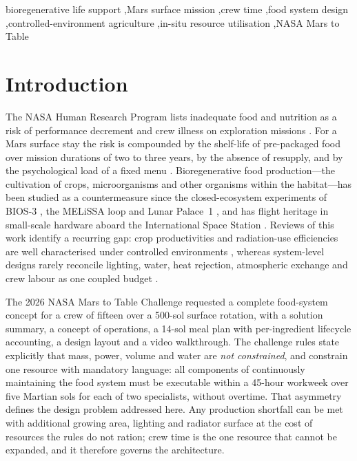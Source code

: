 \documentclass[11pt,a4paper,3p,authoryear]{elsarticle}
\begin{document}
\begin{frontmatter}
\begin{keyword}
bioregenerative life support \sep Mars surface mission \sep crew time \sep food system design \sep controlled-environment agriculture \sep in-situ resource utilisation \sep NASA Mars to Table
\end{keyword}

\end{frontmatter}

\section{Introduction}\label{sec:intro}

The NASA Human Research Program lists inadequate food and nutrition as a risk of performance decrement and crew illness on exploration missions \citep{NASAhrr2026}. For a Mars surface stay the risk is compounded by the shelf-life of pre-packaged food over mission durations of two to three years, by the absence of resupply, and by the psychological load of a fixed menu \citep{Douglas2020spacefood,Smith2021nutrition}. Bioregenerative food production---the cultivation of crops, microorganisms and other organisms within the habitat---has been studied as a countermeasure since the closed-ecosystem experiments of BIOS-3 \citep{Gitelson1989bios3}, the MELiSSA loop \citep{Lasseur2010melissa} and Lunar Palace~1 \citep{Fu2016lunarpalace}, and has flight heritage in small-scale hardware aboard the International Space Station \citep{Massa2017veggie}. Reviews of this work identify a recurring gap: crop productivities and radiation-use efficiencies are well characterised under controlled environments \citep{Wheeler2008productivity,Wheeler2017agriculture}, whereas system-level designs rarely reconcile lighting, water, heat rejection, atmospheric exchange and crew labour as one coupled budget \citep{Monje2003farming}.

The 2026 NASA Mars to Table Challenge \citep{NASAm2t2026} requested a complete food-system concept for a crew of fifteen over a 500-sol surface rotation, with a solution summary, a concept of operations, a 14-sol meal plan with per-ingredient lifecycle accounting, a design layout and a video walkthrough. The challenge rules state explicitly that mass, power, volume and water are \emph{not constrained}, and constrain one resource with mandatory language: all components of continuously maintaining the food system must be executable within a 45-hour workweek over five Martian sols for each of two specialists, without overtime. That asymmetry defines the design problem addressed here. Any production shortfall can be met with additional growing area, lighting and radiator surface at the cost of resources the rules do not ration; crew time is the one resource that cannot be expanded, and it therefore governs the architecture.
\end{document}
